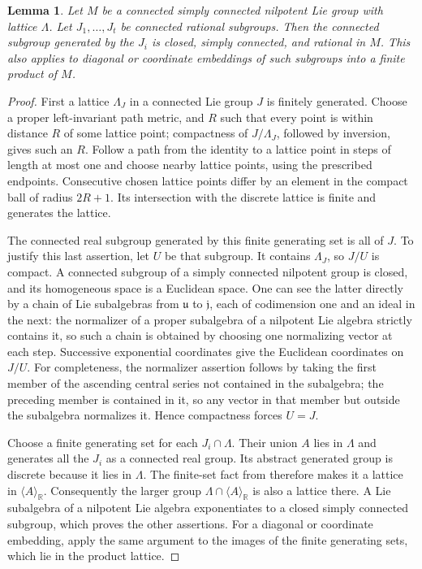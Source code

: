 \documentclass[11pt]{article}
\newtheorem{lemma}[theorem]{Lemma}
\newcommand{\R}{\mathbb R}
\begin{document}
\begin{lemma}\label{lem:rational}
Let $M$ be a connected simply connected nilpotent Lie group with lattice
$\Lambda$. Let $J_1,\ldots,J_t$ be connected rational subgroups. Then the
connected subgroup generated by the $J_i$ is closed, simply connected, and
rational in $M$. This also applies to diagonal or coordinate embeddings of
such subgroups into a finite product of $M$.
\end{lemma}
\begin{proof}
First a lattice $\Lambda_J$ in a connected Lie group $J$ is finitely generated.
Choose a proper left-invariant path metric, and $R$ such that every point is
within distance $R$ of some lattice point; compactness of $J/\Lambda_J$,
followed by inversion, gives such an $R$. Follow a path from the identity to a
lattice point in steps of length at most one and choose nearby lattice points,
using the prescribed endpoints. Consecutive chosen lattice points differ by
an element in the compact ball of radius $2R+1$. Its intersection with the
discrete lattice is finite and generates the lattice.

The connected real subgroup generated by this finite generating set is all
of $J$. To justify this last assertion, let $U$ be that subgroup. It contains
$\Lambda_J$, so $J/U$ is compact. A connected subgroup of a simply connected
nilpotent group is closed, and its homogeneous space is a Euclidean space.
One can see the latter directly by a chain of Lie subalgebras from
$\mathfrak u$ to $\mathfrak j$, each of codimension one and an ideal in the
next: the normalizer of a proper subalgebra of a nilpotent Lie algebra strictly
contains it, so such a chain is obtained by choosing one normalizing vector at
each step. Successive exponential coordinates give the Euclidean coordinates
on $J/U$. For completeness, the normalizer assertion follows by taking the
first member of the ascending central series not contained in the subalgebra;
the preceding member is contained in it, so any vector in that member but
outside the subalgebra normalizes it. Hence compactness forces $U=J$.

Choose a finite generating set for each $J_i\cap\Lambda$. Their union $A$
lies in $\Lambda$ and generates all the $J_i$ as a connected real group.
Its abstract generated group is discrete because it lies in $\Lambda$.
The finite-set fact from \cite[p.~1243]{GTZ} therefore makes it a lattice in
$\langle A\rangle_{\R}$. Consequently the larger group
$\Lambda\cap\langle A\rangle_{\R}$ is also a lattice there. A Lie subalgebra
of a nilpotent Lie algebra exponentiates to a closed simply connected subgroup,
which proves the other assertions. For a diagonal or coordinate embedding,
apply the same argument to the images of the finite generating sets, which
lie in the product lattice.
\end{proof}
\end{document}
